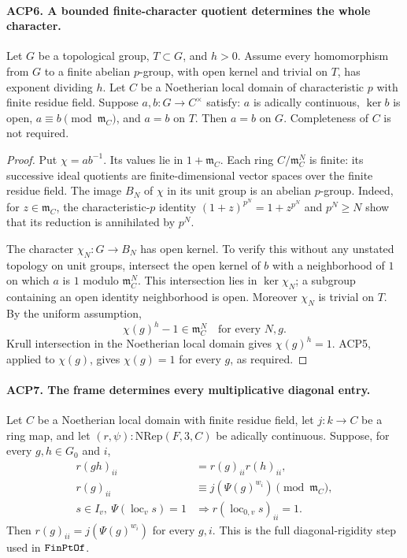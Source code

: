 \documentclass[11pt,a4paper]{article}
\numberwithin{equation}{section}
\theoremstyle{remark}\newtheorem{remark}[theorem]{Remark}
\begin{document}
\paragraph{ACP6. A bounded finite-character quotient determines the whole character.}
\label{claim:ACP6}
Let \(G\) be a topological group, \(T\subset G\), and \(h>0\).
Assume every homomorphism from \(G\) to a finite abelian
\(p\)-group, with open kernel and trivial on \(T\), has exponent
dividing \(h\).  Let \(C\) be a Noetherian local domain of
characteristic \(p\) with finite residue field.  Suppose
\(a,b:G\to C^\times\) satisfy:
\(a\) is adically continuous, \(\ker b\) is open,
\(a\equiv b\pmod{\mathfrak m_C}\), and \(a=b\) on \(T\).
Then \(a=b\) on \(G\).  Completeness of \(C\) is not required.

\begin{proof}
Put \(\chi=ab^{-1}\).  Its values lie in
\(1+\mathfrak m_C\).  Each ring
\(C/\mathfrak m_C^N\) is finite: its successive ideal
quotients are finite-dimensional vector spaces over the finite
residue field.  The image \(B_N\) of \(\chi\) in its unit
group is an abelian \(p\)-group.  Indeed, for
\(z\in\mathfrak m_C\), the characteristic-\(p\) identity
\((1+z)^{p^N}=1+z^{p^N}\) and \(p^N\ge N\) show that its
reduction is annihilated by \(p^N\).

The character \(\chi_N:G\to B_N\) has open kernel.
To verify this without any unstated topology on unit groups,
intersect the open kernel of \(b\) with a neighborhood of
\(1\) on which \(a\) is \(1\) modulo \(\mathfrak m_C^N\).
This intersection lies in \(\ker\chi_N\); a subgroup containing
an open identity neighborhood is open.  Moreover \(\chi_N\)
is trivial on \(T\).  By the uniform assumption,
\[
                  \chi(g)^h-1\in\mathfrak m_C^N
                  \quad\text{for every }N,g.
\]
Krull intersection in the Noetherian local domain gives
\(\chi(g)^h=1\).  ACP5, applied to \(\chi(g)\), gives
\(\chi(g)=1\) for every \(g\), as required.
\end{proof}

\paragraph{ACP7. The frame determines every multiplicative diagonal entry.}
\label{claim:ACP7}
Let \(C\) be a Noetherian local domain with finite residue field,
let \(j:k\to C\) be a ring map, and let
\((r,\psi):\mathrm{NRep}(F,3,C)\) be adically continuous.
Suppose, for every \(g,h\in G_0\) and \(i\),
\[
 \begin{split}
 r(gh)_{ii}&=r(g)_{ii}r(h)_{ii},\\
 r(g)_{ii}&\equiv j(\Psi(g)^{w_i})\pmod{\mathfrak m_C},\\
 s\in I_v,\ \Psi(\operatorname{loc}_v s)=1
       &\Longrightarrow r(\operatorname{loc}_{0,v}s)_{ii}=1.
 \end{split}                                             \tag{ACP.15}
\]
Then \(r(g)_{ii}=j(\Psi(g)^{w_i})\) for every \(g,i\).
This is the full diagonal-rigidity step used in
\(\texttt{Fin\allowbreak Pt\allowbreak Of}\).
\end{document}
